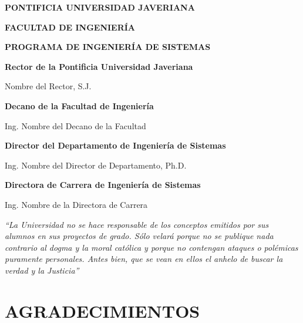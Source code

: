 \documentclass[12pt,letterpaper,oneside]{article}
\newcommand{\universidad}{PONTIFICIA UNIVERSIDAD JAVERIANA}
\newcommand{\universidadNombre}{Pontificia Universidad Javeriana} %
\newcommand{\facultad}{FACULTAD DE INGENIERÍA}
\newcommand{\programa}{PROGRAMA DE INGENIERÍA DE SISTEMAS}
\newcommand{\rector}{Nombre del Rector, S.J.}
\newcommand{\decano}{Ing. Nombre del Decano de la Facultad}
\newcommand{\directorDepto}{Ing. Nombre del Director de Departamento, Ph.D.}
\newcommand{\directorCarrera}{Ing. Nombre de la Directora de Carrera}
\begin{document}
\begin{center}
  {\bfseries \universidad}\par
  {\bfseries \facultad}\par
  {\bfseries \programa}\par
  \vspace{6cm}

  {\bfseries Rector de la \universidadNombre}\par
  \vspace{0.4cm}
  \rector\par
  \vspace{0.9cm}

  {\bfseries Decano de la Facultad de Ingeniería}\par
  \vspace{0.4cm}
  \decano\par
  \vspace{0.9cm}

  {\bfseries Director del Departamento de Ingeniería de Sistemas}\par
  \vspace{0.4cm}
  \directorDepto\par
  \vspace{0.9cm}

  {\bfseries Directora de Carrera de Ingeniería de Sistemas}\par
  \vspace{0.4cm}
  \directorCarrera\par
\end{center}
\clearpage

\vspace{1cm}

\begin{justify}
\itshape
``La Universidad no se hace responsable de los conceptos emitidos por sus alumnos en sus
proyectos de grado. Sólo velará porque no se publique nada contrario al dogma y la moral
católica y porque no contengan ataques o polémicas puramente personales. Antes bien, que se
vean en ellos el anhelo de buscar la verdad y la Justicia''
\end{justify}
\clearpage

\section*{AGRADECIMIENTOS}
\vspace{0.6cm}
\end{document}
